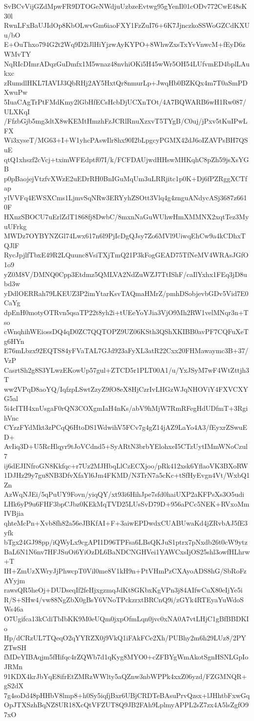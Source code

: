 SvBCvVijGZdMpwFR9DTOGeNWdjuUzbzeEvtwg95gYenIl01cODv772CwE48sK30l
RwnLFxBaUJIdOp8KbOLwvGm6iaoFXY1FzZuI76+6K7JjnczkoSSWoGZCdKXUu/bO
E+OuThxo794G2t2Wq9D2iJlHiYjzwAyKYPO+8WhwZxsTxYvVnwcM+fEyD6zWMvTY
NqRIcDImrADqzGuDmfx1M5wnaz48nvhiOKi5H45wWr5OH54LUfvmED4bplLAukxc
zRumdlHKL7IAVIJ3QbRHj2AY5HxtQr8nmurLp+JwqHb0BZKQx4m7T0aSmPDXwuPw
5IuaCAgTrPtFMdKmy2lGbHfECsHcbDjUCXnTOt/4A7BQWARB6wH1Rw087/ULXKqI
/FfzbGjb5mg3dtX8wKEMtHmzhFzJCRlRnuXzxvT5TYgB/C0uj/jPxv5tKuIPwLFX
Wi3xyseT/MG63+I+W1yhcPAswIlr8hx90I2bLpgcyPGMX42dJ6oIZAVPsBH7QSuE
qtQ1xhszf2cVcj+tximWFEdptf07I/k/FCFDAUjwdHHswMHKqhC8pZh59jsXsYGB
p0pBaojejVtzfvXWzE2uEDrRH0BnIGuMqUm3uLRRjitc1p0K+Dj6fPZRggXCTfap
ylVVFq4EWSXCms1LjmvSqNRw3ERYyhZSOtt3Vlq4g4znguANdycASj3687z6610F
HXnzSBOCU7uErlZdT1868fj8DwbC/8mxnNaGuWUhwHmXMMNX2xqtTez3MyuUFrkg
MWDz7OYBYNZGl74Lwx617n6l9PjIcDgQJsy7Zo6MVl9UiwqEhCw9a4kCDhxTQJlF
RycJpjlfTbxE49R2LQuunc8VsiTXjTmQ21P3kFogGEAD75TfNeMV4WRAsJGfO1o9
yZ0M8V/DMNQ0Cpp3Etdmz5QMLVA2NdZuWZJ7TtIShF/caIlYxhx1FEq3jD8ubd3w
yDdlOERRah79LKEUZ3P2imYtarKsvTAQmaHMrZ/pmhDSobjevbGDv5Vid7E0CaYg
dpEnH0motyOTRvn5qsaTP22t8yh2i+tUEeYoYJia3VjO9Mh2RW1velMNqr3n+Tso
cWnqhihWEiossDQ4qD0ZC7QQTOPZ9UZ06KSth3QShXKIBB0avPF7CQFuXeTg6HYn
E76mLbzx92EQTS84yFVaTAL7GJd923aFyXL3atR22Cxx20FHMawaymc3B+37/VzP
CasrtSh2g8S3YLwzEKowUp57gul+ZTCD5r1PLT00A1/u/YxJSyM7wF4WtZttjh3T
ww2VPqD8aoYQ/IqfzpLSwtZzyZ9fO8eX8HjCzrIvLHGzWJqNHOViY4FXVCXYG5al
5i4cITH4xnUsgaF0rQN3COXgmIaH4nKs/abV9hMjW7RmRFegHdUDfmT+3RgihVnc
CYzzFYdMkt3zPCqQ6HtoDS1WdwihV5FCv7g4gZ14jAZ9LaYo4A3/fEyxrZSwuED+
AvIiq3D+U5RcHlqyr9tJoVCdnd5+SyARtN3brbYElohxeI5CTzUytIMmWNoCzul7
ij6dEJINfroGN8Kkfqc+r7Uz2MJHbqLlCzECXjoo/pRk412xsk6YflaoVK3BXoRW
1DJHz29y7gu8NB3DfvXfaYl6Jm4FKMD/N3TrN7a5cKc+tSfHyEvgn4Vt/WxbQ1Zn
AzWqNJEi/5qPuUY9Fovn/yiqQY/xt93i6HihJpe7sfd0haiUXP2aKFPsXs3O5udi
LHk6yP9u6FHF3bpCJbz0KEkMqTVD25LUsSvD79D+956aPCc5NEK+RVxoMmIVBjia
qhteMcPn+Xvb8fh82a56eJBKfAI+F+3aiwEPDwdxCUABUwaKd4jZRvbAJ5fE3yfk
bTgx24GJ98pp/iQWyLx9cgAPI1D96TPFsa6LBsQKJuS1ptrx7pNxdb26t0cW9ytz
BaL6N1N6nv7HFJSuOi6YiOzDL6BaNDCNGHVei1YAWCxsIjOS25shl3owfHLhrw+T
IH+ZmUzXWryJjPhwcpT0Vil0me8V1kH9n+PtVHmPzCXAyoADS8hG/SbRoFzAYyjm
rawsQR5heOj+DUDseqIf2feHjxgzmqJdKt8GKbxKgVPn3j84AIfwCuX80eIjYe5i
R/S+SHw4/vw88NgZbX0gBsY6VNoTPckzrxtBRCnQ9i/zGYk4RTEyaYuWdoSWs46a
O7Ugifca13kCdiTbIbKK9M0eUQm0jxpOfmLqn0jvc0xNA0A7vtLHjC1gBfBBDKIo
Hp/dCRzUL7TQeqO2qYYRZX0j9VkQ1iFAkFCe2Xh/PUBhy2m6h29LUz8/2PYZTwSH
fMDeYIBAqjm5fHifqc4rZQWb7d1qKyg8MYO0+cZFBYgWmAkotSgnHSNLGpIoJRMn
91KDX4krJbYqE8ifrEtZMRzWWlty5aQZnw3nbWPPk4xxZ06yzd/FZGMNQR+gS2dX
7g4soDd48pHHbV8lmp8+h0Sy5iqfjBxr6UBjCRDTeBAsuPrvQzsx+lJHhtbFxwGq
OpJTXSzhBqNZ8UR18XcQtVFZUT8Q9JB2FAh9LplmyAPPL2sZ7zx4A5lsZgfO97xO
